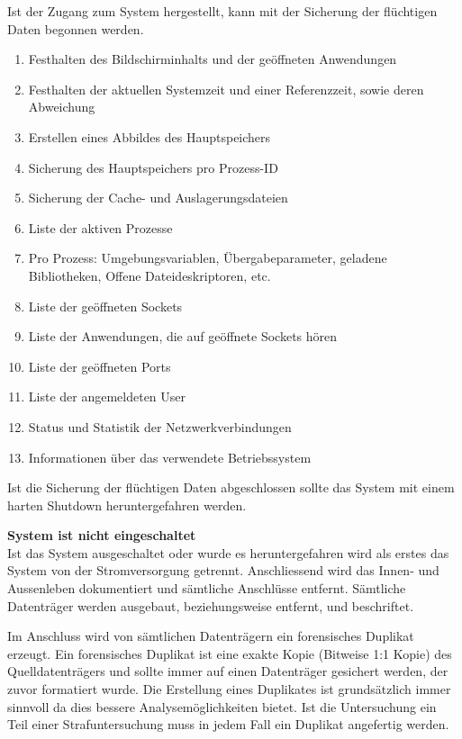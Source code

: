 Ist der Zugang zum System hergestellt, kann mit der Sicherung der flüchtigen Daten begonnen werden. 

\begin{enumerate}
\item Festhalten des Bildschirminhalts und der geöffneten Anwendungen
\item Festhalten der aktuellen Systemzeit und einer Referenzzeit, sowie deren Abweichung
\item Erstellen eines Abbildes des Hauptspeichers
\item Sicherung des Hauptspeichers pro Prozess-ID
\item Sicherung der Cache- und Auslagerungsdateien
\item Liste der aktiven Prozesse
\item Pro Prozess: Umgebungsvariablen, Übergabeparameter, geladene Bibliotheken, Offene Dateideskriptoren, etc.
\item Liste der geöffneten Sockets
\item Liste der Anwendungen, die auf geöffnete Sockets hören
\item Liste der geöffneten Ports
\item Liste der angemeldeten User
\item Status und Statistik der Netzwerkverbindungen
\item Informationen über das verwendete Betriebssystem
\end{enumerate}


Ist die Sicherung der flüchtigen Daten abgeschlossen sollte das System mit einem harten Shutdown heruntergefahren werden.


\textbf{System ist nicht eingeschaltet}\\
Ist das System ausgeschaltet oder wurde es heruntergefahren wird als erstes das System von der Stromversorgung getrennt. Anschliessend wird das Innen- und Aussenleben dokumentiert und sämtliche Anschlüsse entfernt. Sämtliche Datenträger werden ausgebaut, beziehungsweise entfernt, und beschriftet.

Im Anschluss wird von sämtlichen Datenträgern ein forensisches Duplikat erzeugt. Ein forensisches Duplikat ist eine exakte Kopie (Bitweise 1:1 Kopie) des Quelldatenträgers und sollte immer auf einen Datenträger gesichert werden, der zuvor formatiert wurde. Die Erstellung eines Duplikates ist grundsätzlich immer sinnvoll da dies bessere Analysemöglichkeiten bietet. Ist die Untersuchung ein Teil einer Strafuntersuchung muss in jedem Fall ein Duplikat angefertig werden.

